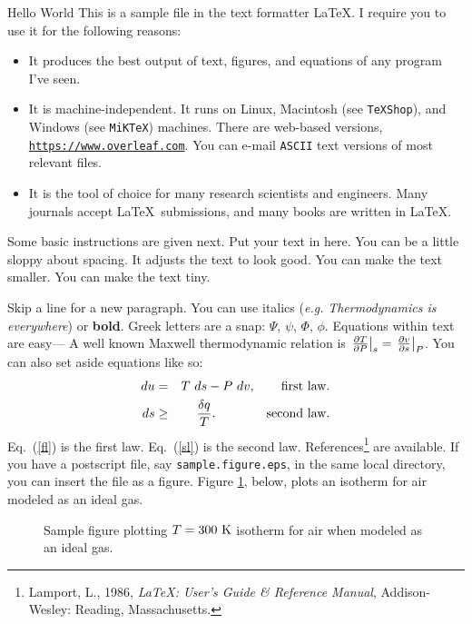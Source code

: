 \documentclass{article}
\begin{document}

\medskip
Hello World
This is a sample file in the text formatter \LaTeX.
I require you to use it for the following reasons:

\begin{itemize}

\item{It produces the best output of text, figures,
      and equations of any
      program I've seen.}

\item{It is machine-independent. It runs on Linux, Macintosh (see {\tt TeXShop}), and Windows (see {\tt MiKTeX}) machines.  There are web-based versions, \href{https://www.overleaf.com}{\tt https://www.overleaf.com}.
     You can e-mail {\tt ASCII} text versions of most relevant files.}

\item{It is the tool of choice for many research
     scientists and engineers.
     Many journals accept 
     \LaTeX~submissions, and many books
     are written in \LaTeX.}

\end{itemize}
\medskip
Some basic instructions are given next.
Put your text in here.  You can be a little sloppy    about
spacing.  It adjusts the text to look good.
{\small You can make the text smaller.}
{\tiny You can make the text tiny.}

Skip a line for a new paragraph.   
You can use italics ({\em e.g.} {\em  Thermodynamics is everywhere}) or {\bf bold}.
Greek letters are a snap: $\Psi$, $\psi$,
$\Phi$, $\phi$.  Equations within text are easy---
A well known Maxwell thermodynamic relation is
$\left.{\partial T \over \partial P}\right|_{s} = 
\left.{\partial v \over \partial s}\right|_{P}$.
You can also set aside equations like so:
\begin{eqnarray}
du &=& T\ ds -P\ dv, \qquad \mbox{first law.}\label{fl}\\
ds &\ge& {\delta q \over T}.\qquad  \qquad \mbox{second law.} \label{sl}
\end{eqnarray}
Eq.~(\ref{fl}) is the first law.
Eq.~(\ref{sl}) is the second law.
References\footnote{Lamport, L., 1986, {\em \LaTeX: User's Guide \& Reference Manual},
    Addison-Wesley: Reading, Massachusetts.}
are available. 
If you have a postscript file, say {\tt sample.figure.eps}, in the same local directory,
you can insert the file as a figure.  Figure \ref{sample}, below, plots an isotherm for air modeled as an ideal gas. 
\begin{figure}[ht]
\epsfxsize=2.5in
\centerline{}
\caption{Sample figure plotting $T=300~{\rm K}$ isotherm for air when modeled as an ideal gas.}
\label{sample}
\end{figure}
\end{document}
